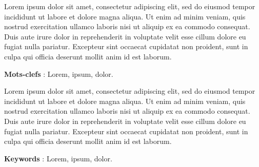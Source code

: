 \documentclass[french]{report}
\begin{document}
\vspace*{25px}

Lorem ipsum dolor sit amet, consectetur adipiscing elit, sed do eiusmod tempor incididunt ut labore et dolore magna aliqua. Ut enim ad minim veniam, quis nostrud exercitation ullamco laboris nisi ut aliquip ex ea commodo consequat. Duis aute irure dolor in reprehenderit in voluptate velit esse cillum dolore eu fugiat nulla pariatur. Excepteur sint occaecat cupidatat non proident, sunt in culpa qui officia deserunt mollit anim id est laborum.

\textbf{Mots-clefs} : Lorem, ipsum, dolor.\\

\vspace*{35px}

\vspace*{25px}

Lorem ipsum dolor sit amet, consectetur adipiscing elit, sed do eiusmod tempor incididunt ut labore et dolore magna aliqua. Ut enim ad minim veniam, quis nostrud exercitation ullamco laboris nisi ut aliquip ex ea commodo consequat. Duis aute irure dolor in reprehenderit in voluptate velit esse cillum dolore eu fugiat nulla pariatur. Excepteur sint occaecat cupidatat non proident, sunt in culpa qui officia deserunt mollit anim id est laborum.

\textbf{Keywords} : Lorem, ipsum, dolor.\\
\end{document}
